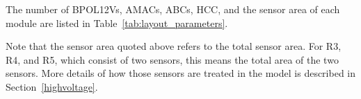 The number of BPOL12Vs, AMACs, ABCs, HCC, and the sensor area of each module are listed in
Table~\ref{tab:layout_parameters}.
%
\let\arraystretcha\arraystretch
\renewcommand\arraystretch{1.1} %
\begin{table}[h]
\begin{center}
\end{center}
\caption{Number of components on each module. The sensor area refers to the total sensor area, e.g.
for R3, R4, and R5 it refers to the sum of the two sensors on the module.}
\label{tab:layout_parameters}
\end{table}
\let\arraystretch\arraystretcha

Note that the sensor area quoted above refers to the total sensor area. For R3, R4, and R5, which
consist of two sensors, this means the total area of the two sensors. More details of how those sensors
are treated in the model is described in Section~\ref{highvoltage}.
